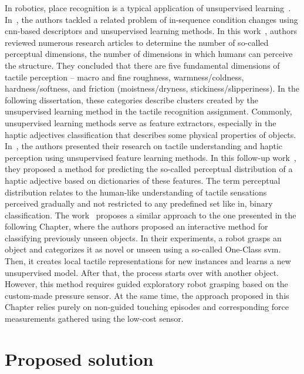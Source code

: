 \documentclass[a4paper, 10pt, twoside]{report}
\begin{document}
In robotics, place recognition is a typical application of unsupervised learning~\cite{place1, place2, place3, place4}. In~\cite{place5}, the authors tackled a related problem of in-sequence condition changes using \acrshort{cnn}-based descriptors and unsupervised learning methods. In this work~\cite{review_on_haptic_perception}, authors reviewed numerous research articles to determine the number of so-called perceptual dimensions, \ie the number of dimensions in which humans can perceive the structure. They concluded that there are five fundamental dimensions of tactile perception -- macro and fine roughness, warmness/coldness, hardness/softness, and friction (moistness/dryness, stickiness/slipperiness). In the following dissertation, these categories describe clusters created by the unsupervised learning method in the tactile recognition assignment. Commonly, unsupervised learning methods serve as feature extractors, especially in the haptic adjectives classification that describes some physical properties of objects. In~\cite{Richardson2019LearningTP}, the authors presented their research on tactile understanding and haptic perception using unsupervised feature learning methods. In this follow-up work~\cite{Richardson2019LearningTPfollowup}, they proposed a method for predicting the so-called perceptual distribution of a haptic adjective based on dictionaries of these features. The term perceptual distribution relates to the human-like understanding of tactile sensations perceived gradually and not restricted to any predefined set like in, \eg binary classification. The work~\cite{classification_of_unseen} proposes a similar approach to the one presented in the following Chapter, where the authors proposed an interactive method for classifying previously unseen objects. In their experiments, a robot grasps an object and categorizes it as novel or unseen using a so-called One-Class \acrfull{svm}. Then, it creates local tactile representations for new instances and learns a new unsupervised model. After that, the process starts over with another object. However, this method requires guided exploratory robot grasping based on the custom-made pressure sensor. At the same time, the approach proposed in this Chapter relies purely on non-guided touching episodes and corresponding force measurements gathered using the low-cost sensor.

\section{Proposed solution}
\label{part:methods:materials:solution}
\end{document}
